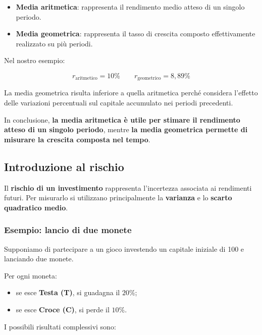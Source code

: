 \begin{itemize}
    \item \textbf{Media aritmetica}: rappresenta il rendimento medio atteso di un singolo periodo.

    \item \textbf{Media geometrica}: rappresenta il tasso di crescita composto effettivamente realizzato su più periodi.
\end{itemize}

\noindent Nel nostro esempio:

\[
\boxed{
r_{\text{aritmetico}}=10\%
\qquad
r_{\text{geometrico}}=8{,}89\%
}
\]

\noindent La media geometrica risulta inferiore a quella aritmetica
perché considera l'effetto delle variazioni percentuali
sul capitale accumulato nei periodi precedenti.

\medskip

\noindent In conclusione, \textbf{la media aritmetica è utile per stimare il rendimento atteso di un singolo periodo}, mentre
\textbf{la media geometrica permette di misurare la crescita composta nel tempo}.
\subsection{Introduzione al rischio}

\noindent Il \textbf{rischio di un investimento} rappresenta
l'incertezza associata ai rendimenti futuri. Per misurarlo
si utilizzano principalmente la \textbf{varianza} e lo
\textbf{scarto quadratico medio}.

\subsubsection*{Esempio: lancio di due monete}

\noindent Supponiamo di partecipare a un gioco investendo
un capitale iniziale di 100 e lanciando due monete.

\medskip

\noindent Per ogni moneta:

\begin{itemize}
    \item se esce \textbf{Testa (T)}, si guadagna il $20\%$;
    \item se esce \textbf{Croce (C)}, si perde il $10\%$.
\end{itemize}

\noindent I possibili risultati complessivi sono:

